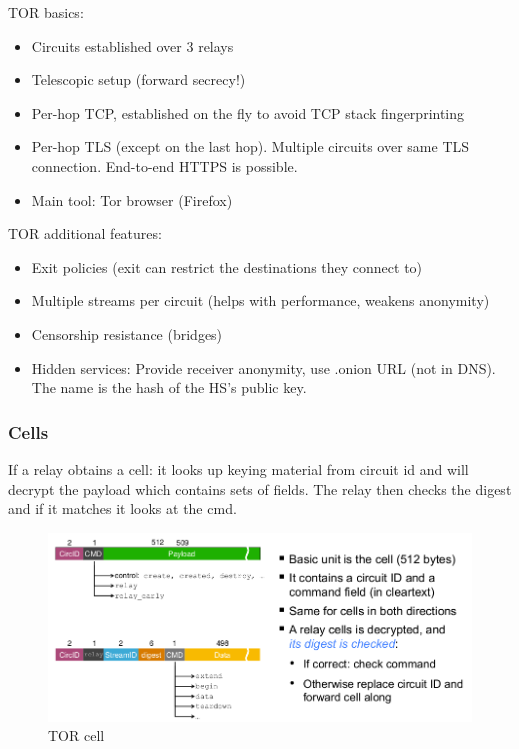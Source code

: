 \documentclass[11pt,oneside,a4paper]{article}
\begin{document}
TOR basics:

\vspace{-\topsep}
\begin{itemize}
	\setlength{\itemsep}{0pt}
	\setlength{\parskip}{0pt}
	\item Circuits established over 3 relays
	\item Telescopic setup (forward secrecy!)
	\item Per-hop TCP, established on the fly to avoid TCP stack fingerprinting
	\item Per-hop TLS (except on the last hop). Multiple circuits over same TLS connection. End-to-end HTTPS is possible.
	\item Main tool: Tor browser (Firefox)
\end{itemize}
\vspace{-\topsep}

\noindent TOR additional features:

\vspace{-\topsep}
\begin{itemize}
	\setlength{\itemsep}{0pt}
	\setlength{\parskip}{0pt}
	\item Exit policies (exit can restrict the destinations	they connect to)
	\item Multiple streams per circuit (helps with performance, weakens anonymity)
	\item Censorship resistance (bridges)
	\item Hidden services: Provide receiver anonymity, use .onion URL (not in DNS). The name is the hash of the HS’s public key.
\end{itemize}
\vspace{-\topsep}

\subsubsection{Cells}

If a relay obtains a cell: it looks up keying material from circuit id and will decrypt the payload which contains sets of fields. The relay then checks the digest and if it matches it looks at the cmd.

\begin{figure}[hb]
	\centering
	\includegraphics[width=0.7\linewidth]{figures/tor_cell}
	\caption{TOR cell}
	\label{fig:torcell}
\end{figure}
\end{document}
